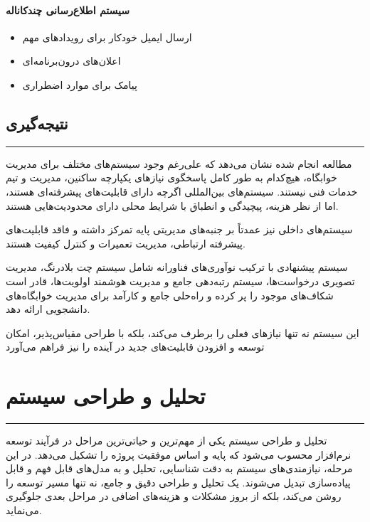 \documentclass[12pt,a4paper]{report}
\begin{document}
	\subsubsection{سیستم اطلاع‌رسانی چندکاناله}
	\begin{itemize}
		\item ارسال ایمیل خودکار برای رویدادهای مهم
		\item اعلان‌های درون‌برنامه‌ای
		\item پیامک برای موارد اضطراری
	\end{itemize}
	
	\section{نتیجه‌گیری}
	
	\noindent\rule{\textwidth}{0.4pt}
	
	مطالعه انجام شده نشان می‌دهد که علی‌رغم وجود سیستم‌های مختلف برای مدیریت خوابگاه، هیچ‌کدام به طور کامل پاسخگوی نیازهای یکپارچه ساکنین، مدیریت و تیم خدمات فنی نیستند. سیستم‌های بین‌المللی اگرچه دارای قابلیت‌های پیشرفته‌ای هستند، اما از نظر هزینه، پیچیدگی و انطباق با شرایط محلی دارای محدودیت‌هایی هستند.
	
	سیستم‌های داخلی نیز عمدتاً بر جنبه‌های مدیریتی پایه تمرکز داشته و فاقد قابلیت‌های پیشرفته ارتباطی، مدیریت تعمیرات و کنترل کیفیت هستند.
	
	\hspace{0.000001cm}  سیستم پیشنهادی با ترکیب نوآوری‌های فناورانه شامل سیستم چت بلادرنگ، مدیریت تصویری درخواست‌ها، سیستم رتبه‌دهی جامع و مدیریت هوشمند اولویت‌ها، قادر است شکاف‌های موجود را پر کرده و راه‌حلی جامع و کارآمد برای مدیریت خوابگاه‌های دانشجویی ارائه دهد.
	
	این سیستم نه تنها نیازهای فعلی را برطرف می‌کند، بلکه با طراحی مقیاس‌پذیر، امکان توسعه و افزودن قابلیت‌های جدید در آینده را نیز فراهم می‌آورد
	
	
	
	\chapter{تحلیل و طراحی سیستم}
	\vspace{-2.5\baselineskip}
	\noindent\rule{\textwidth}{0.4pt}
	
	\hspace{-0.1cm}
	تحلیل و طراحی سیستم یکی از مهم‌ترین و حیاتی‌ترین مراحل در فرآیند توسعه نرم‌افزار محسوب می‌شود که پایه و اساس موفقیت پروژه را تشکیل می‌دهد. در این مرحله، نیازمندی‌های سیستم به دقت شناسایی، تحلیل و به مدل‌های قابل فهم و قابل پیاده‌سازی تبدیل می‌شوند. یک تحلیل و طراحی دقیق و جامع، نه تنها مسیر توسعه را روشن می‌کند، بلکه از بروز مشکلات و هزینه‌های اضافی در مراحل بعدی جلوگیری می‌نماید.
	
\end{document}
